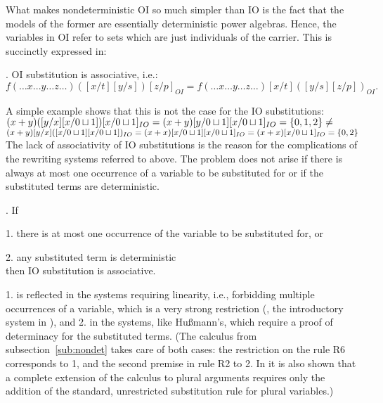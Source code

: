 {What makes nondeterministic OI so much simpler than IO is the fact that the models of the former 
are essentially deterministic power algebras. Hence, the variables in OI refer to sets which are just 
individuals of the carrier. This is succinctly expressed in:
\begin{Claim} 
{\rm \cite{c:34}.} OI substitution is associative, i.e.: 
\[
f(\ldots x...y\ldots z\ldots) ([x/t][y/s])[z/p]_{OI} = f(\ldots x\ldots 
y\ldots z\ldots) [x/t]([y/s][z/p])_{OI}. 
\]
\end{Claim}
A simple example shows that this is not the case for the IO substitutions:\\[1ex]
\hspace*{1.5em} $
(x + y) ([y/x][x/0\sqcup 1]) [x/0\sqcup 1]_{IO} = (x + y) [y/0\sqcup 1] 
[x/0\sqcup 1]_{IO} = \{0,1,2\} \not= 
 $ \\[.5ex] 
\hspace*{1.5em} $
(x + y) [y/x] ([x/0\sqcup 1][x/0\sqcup 1])_{IO} = (x + x) [x/0\sqcup 1] [x/0\sqcup 
1]_{IO} = (x + x) [x/0\sqcup 1]_{IO} = \{0,2\}
$ \\[1ex]
The lack of associativity of IO substitutions is the reason for the complications of the rewriting systems 
referred to above. The problem does not arise if there is always at most one occurrence of a variable to be 
substituted for or if the substituted terms are deterministic. 
\begin{Claim}{\rm \cite{c:34}.} 
If 

	1. there is at most one occurrence of the variable to be substituted for, or 
	
	2. any substituted term is deterministic \\
then IO substitution is associative. 
\end{Claim} 
1. is reflected in the systems requiring linearity, i.e., forbidding multiple occurrences of a variable, which is 
a very strong restriction (\cite{c:63}, the introductory system in \cite{c:58}), and 
2. in the systems, like Hu{\ss}mann's, 
which require a proof of determinacy for the substituted terms. (The calculus 
from subsection~\ref{sub:nondet} takes 
care of both cases: the restriction on the rule R6 corresponds to 1, and 
the second premise in rule R2 to 2.
In \cite{c:130} it is also shown that a complete extension of the calculus to plural arguments requires only 
the addition of the standard, unrestricted substitution rule for plural variables.)

}
